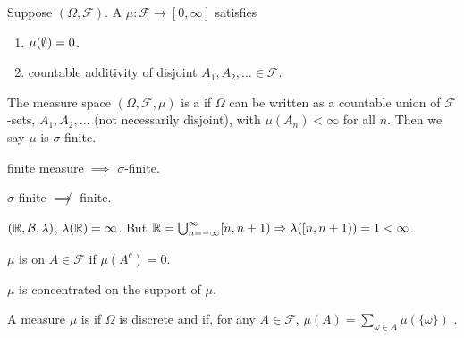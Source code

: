 \documentclass[class=article,crop=false]{standalone}
\begin{document}
\begin{defn}[]
	Suppose $ (\Omega, \mathcal{F})$. A  $ \mu: \mathcal{F} \to [0, \infty]$ satisfies 
	\begin{enumerate}[label=(\roman*)]
		\item $ \mu( \emptyset) = 0$.
		\item countable additivity of disjoint $ A_1,A_2,\ldots \in \mathcal{F}$.
	\end{enumerate}
\end{defn}

\begin{defn}
	The measure space $ (\Omega,\mathcal{F},\mu)$ is a  if $ \Omega$ can be written as a countable union of $ \mathcal{F}$-sets, $ A_1, A_2,\ldots$ (not necessarily disjoint), with $ \mu(A_n) < \infty$ for all $ n$. Then we say  $ \mu$ is $ \sigma$-finite. 
\end{defn}

\begin{note}[]
	finite measure $ \implies$ $ \sigma$-finite.

	$ \sigma$-finite $ \not \implies$ finite.
	\begin{eg}[]
		$ (\mathbb{R}, \mathcal{B}, \lambda)$, $ \lambda ( \mathbb{R}) = \infty$. But $ \mathbb{R} = \bigcup_{ n =- \infty}^{\infty} [n,n+1) \Rightarrow \lambda([n,n+1))=1 < \infty$.
	\end{eg}
\end{note}

\begin{defn}[]
	$ \mu$ is  on $ A \in \mathcal{F}$ if $ \mu(A^{c})=0$. 
\end{defn}
\begin{note}[]
$ \mu$ is concentrated on the support of $ \mu$.
\end{note}

\begin{defn}
	A measure $ \mu$ is  if $ \Omega$ is discrete and if, for any $ A \in \mathcal{F}$, $ \mu(A) = \sum_{\omega \in A} \mu(\{\omega\} )$ .
\end{defn}
\end{document}
